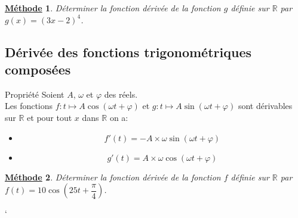 \documentclass[11pt,a4paper]{article}
\def\R{{\mathbb R}}
\theoremstyle{break}
\newtheorem{Meth}{\underline{Méthode}}
\begin{document}

\begin{Meth}
Déterminer la fonction dérivée de la fonction $g$ définie sur $\R$ par $g(x)=(3x-2)^4$.
\end{Meth} 



\subsection{Dérivée des fonctions trigonométriques composées}

	\begin{bclogo}[couleur = yellow!30, arrondi = 0.1,logo=\bcbook]{Propriété}
	Soient $A$, $\omega$ et $\varphi$ des réels. \\
	Les fonctions $f : t \longmapsto A\cos(\omega t+\varphi)$ et $g:t \longmapsto  A\sin(\omega t+\varphi) $ sont dérivables sur $\R$ et pour tout $x$ dans $\R$ on a:\begin{itemize}
		\item $$f'(t)=-A \times \omega \sin(\omega t+\varphi)$$
		\item $$g'(t)=A \times \omega \cos(\omega t+\varphi)$$ 
	\end{itemize}
	 
	\end{bclogo}



\begin{Meth}
Déterminer la fonction dérivée de la fonction $f$ définie sur $\R$ par $f(t)=10\cos(25t+\dfrac{\pi}{4})$.
\end{Meth} 



		

	

`
\end{document}
